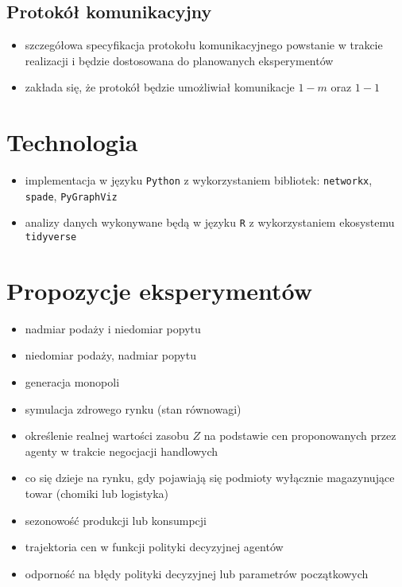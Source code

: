 \documentclass[]{article}
\providecommand{\tightlist}{%
  \setlength{\itemsep}{0pt}\setlength{\parskip}{0pt}}
\begin{document}
\hypertarget{protokuxf3ux142-komunikacyjny}{%
\subsection{Protokół
komunikacyjny}\label{protokuxf3ux142-komunikacyjny}}

\begin{itemize}
\tightlist
\item
  szczegółowa specyfikacja protokołu komunikacyjnego powstanie w trakcie
  realizacji i będzie dostosowana do planowanych eksperymentów
\item
  zakłada się, że protokół będzie umożliwiał komunikacje \(1-m\) oraz
  \(1-1\)
\end{itemize}

\hypertarget{technologia}{%
\section{Technologia}\label{technologia}}

\begin{itemize}
\tightlist
\item
  implementacja w języku \texttt{Python} z wykorzystaniem bibliotek:
  \texttt{networkx}, \texttt{spade}, \texttt{PyGraphViz}
\item
  analizy danych wykonywane będą w języku \texttt{R} z wykorzystaniem
  ekosystemu \texttt{tidyverse}
\end{itemize}

\hypertarget{propozycje-eksperymentuxf3w}{%
\section{Propozycje eksperymentów}\label{propozycje-eksperymentuxf3w}}

\begin{itemize}
\tightlist
\item
  nadmiar podaży i niedomiar popytu
\item
  niedomiar podaży, nadmiar popytu
\item
  generacja monopoli
\item
  symulacja zdrowego rynku (stan równowagi)
\item
  określenie realnej wartości zasobu \(Z\) na podstawie cen
  proponowanych przez agenty w trakcie negocjacji handlowych
\item
  co się dzieje na rynku, gdy pojawiają się podmioty wyłącznie
  magazynujące towar (chomiki lub logistyka)
\item
  sezonowość produkcji lub konsumpcji
\item
  trajektoria cen w funkcji polityki decyzyjnej agentów
\item
  odporność na błędy polityki decyzyjnej lub parametrów początkowych
\end{itemize}
\end{document}
